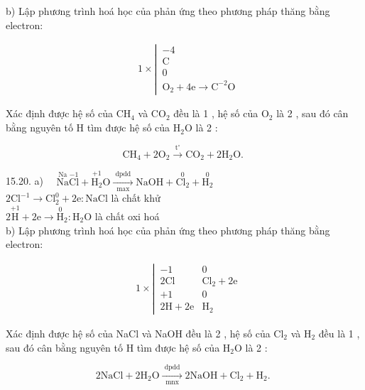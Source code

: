 \documentclass[10pt]{article}
\begin{document}
b) Lập phương trình hoá học của phản ứng theo phương pháp thăng bằng electron:

$$
\begin{aligned}
& 1 \times \left\lvert\, \begin{array}{l}
-4 \\
\mathrm{C} \\
0 \\
\mathrm{O}_{2}+4 \mathrm{e} \longrightarrow \mathrm{C}^{-2} \mathrm{O}
\end{array}\right.
\end{aligned}
$$

Xác định được hệ số của $\mathrm{CH}_{4}$ và $\mathrm{CO}_{2}$ đều là 1 , hệ số của $\mathrm{O}_{2}$ là 2 , sau đó cân bằng nguyên tố H tìm được hệ số của $\mathrm{H}_{2} \mathrm{O}$ là 2 :

$$
\mathrm{CH}_{4}+2 \mathrm{O}_{2} \xrightarrow{\mathrm{t}^{\circ}} \mathrm{CO}_{2}+2 \mathrm{H}_{2} \mathrm{O} \text {. }
$$

15.20. a) $\quad \stackrel{\mathrm{Na}}{\mathrm{Na}} \stackrel{-1}{\mathrm{Cl}}+\stackrel{+1}{\mathrm{H}_{2}} \mathrm{O} \xrightarrow[\text { max }]{\text { dpdd }} \mathrm{NaOH}+\stackrel{0}{\mathrm{Cl}_{2}}+\stackrel{0}{\mathrm{H}_{2}}$\\
$2 \mathrm{Cl}^{-1} \longrightarrow \mathrm{Cl}_{2}^{0}+2 \mathrm{e}: \mathrm{NaCl}$ là chất khử\\
$2 \stackrel{+1}{\mathrm{H}}+2 \mathrm{e} \longrightarrow \stackrel{0}{\mathrm{H}}_{2}: \mathrm{H}_{2} \mathrm{O}$ là chất oxi hoá\\
b) Lập phương trình hoá học của phản ứng theo phương pháp thăng bằng electron:

$$
\begin{aligned}
& 1 \times \left\lvert\, \begin{array}{ll}
-1 & 0 \\
2 \mathrm{Cl} & \mathrm{Cl}_{2}+2 \mathrm{e} \\
+1 & 0 \\
2 \mathrm{H}+2 \mathrm{e} & \mathrm{H}_{2}
\end{array}\right.
\end{aligned}
$$

Xác định được hệ số của NaCl và NaOH đều là 2 , hệ số của $\mathrm{Cl}_{2}$ và $\mathrm{H}_{2}$ đều là 1 , sau đó cân bằng nguyên tố H tìm được hệ số của $\mathrm{H}_{2} \mathrm{O}$ là 2 :

$$
2 \mathrm{NaCl}+2 \mathrm{H}_{2} \mathrm{O} \xrightarrow[\operatorname{mnx}]{\text { dpdd }} 2 \mathrm{NaOH}+\mathrm{Cl}_{2}+\mathrm{H}_{2} \text {. }
$$
\end{document}
